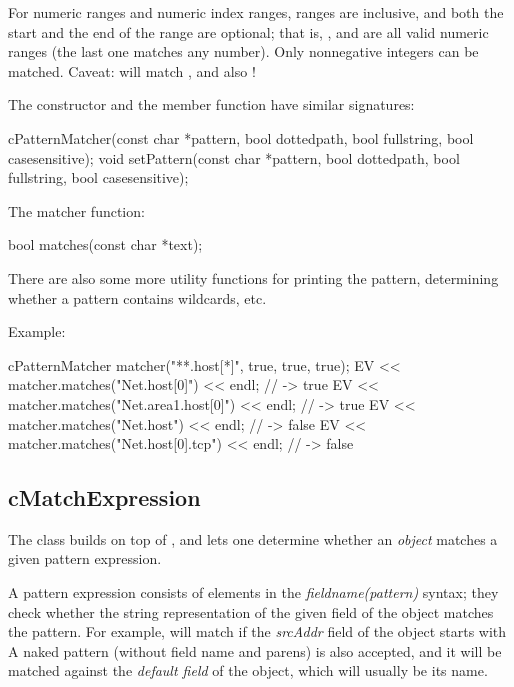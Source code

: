 For numeric ranges and numeric index ranges, ranges are inclusive, and both
the start and the end of the range are optional; that is, ,
 and  are all valid numeric ranges (the last one
matches any number). Only nonnegative integers can be matched. Caveat:
 will match ,  and also !

The  constructor and the  member
function have similar signatures:

\begin{cpp}
cPatternMatcher(const char *pattern, bool dottedpath, bool fullstring,
                bool casesensitive);
void setPattern(const char *pattern, bool dottedpath, bool fullstring,
                bool casesensitive);
\end{cpp}

The matcher function:

\begin{cpp}
bool matches(const char *text);
\end{cpp}

There are also some more utility functions for printing the pattern,
determining whether a pattern contains wildcards, etc.

Example:

\begin{cpp}
cPatternMatcher matcher("**.host[*]", true, true, true);
EV << matcher.matches("Net.host[0]") << endl;  // -> true
EV << matcher.matches("Net.area1.host[0]") << endl;  // -> true
EV << matcher.matches("Net.host") << endl;  // -> false
EV << matcher.matches("Net.host[0].tcp") << endl;  // -> false
\end{cpp}


\subsection{cMatchExpression}
\label{sec:sim-lib:cmatchexpression}

The  class builds on top of ,
and lets one determine whether an \textit{object} matches a given pattern
expression.

A pattern expression consists of elements in the
\textit{fieldname(pattern)} syntax; they check whether the string
representation of the given field of the object matches the pattern. For
example,  will match if the \textit{srcAddr}
field of the object starts with  A naked pattern (without
field name and parens) is also accepted, and it will be matched against the
\textit{default field} of the object, which will usually be its name.

